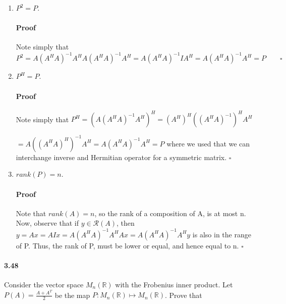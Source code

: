 \documentclass[letterpaper,12pt]{article}
\theoremstyle{definition}
\begin{document}
\begin{enumerate}[label=(\roman*)]

\item $P^2 = P$.

\paragraph{Proof} Note simply that $P^2 
= A(A^HA)^{-1}A^HA(A^HA)^{-1}A^H
= A(A^HA)^{-1} I A^H
= A(A^HA)^{-1}A^H = P \qquad \square$

\item $P^H = P$.

\paragraph{Proof} Note simply that 
$P^H = (A(A^HA)^{-1}A^H)^H
= (A^H)^H((A^HA)^{-1})^HA^H $

$= A ((A^HA)^H)^{-1}A^H 
= A(A^HA)^{-1}A^H = P$
where we used that we can interchange inverse and Hermitian operator for a symmetric matrix. $\square$

\item $rank(P) = n$.

\paragraph{Proof} Note that $rank(A) = n$, so the rank of a composition of A, is at most n. Now, observe that if $y \in \mathscr{R}(A)$, then $y = Ax = AIx = A(A^HA)^{-1}A^HAx =A(A^HA)^{-1}A^Hy $ is also in the range of P. Thus, the rank of P, must be lower or equal, and hence equal to n. $\square$

\end{enumerate}

\paragraph{3.48} Consider the vector space $M_{n}(\mathds{R})$ with the Frobenius inner product. Let $P(A) = \frac{A + A^T}{2}$ be the map $P: M_{n}(\mathds{R}) \mapsto M_{n}(\mathds{R})$. Prove that
\end{document}
